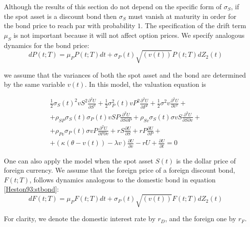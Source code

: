     \begin{frame}
        Although  the  results  of  this  section  do  not  depend  on  the specific
        form  of $\sigma_S$,  if  the  spot  asset  is  a  discount  bond  then  
        $\sigma_S$  must vanish  at  maturity  in  order  for  the  bond  price  
        to  reach  par  with  probability  $1$.  The  specification  of  the  drift
        term  $\mu_S$ is  not important  because it  will  not  affect  option  prices. 
        We  specify  analogous  dynamics  for the  bond  price:
        \begin{equation}\label{Heston93:stbond}
            dP(t; T) = \mu_P P(t; T) dt + \sigma_P(t) \sqrt{(v(t))} P(t; T)dZ_2(t)
        \end{equation}
    \end{frame}
    
    \begin{frame}
        we assume that the variances of both the spot asset and the bond are determined 
        by the same variable $v(t)$. In this model, the valuation equation is

        \begin{multline}
            \frac{1}{2}\sigma_S(t)^2vS^2\frac{\partial^2U}{\partial S^2} + \frac{1}{2}\sigma_P^2(t)vP^2\frac{\partial^2U}{\partial P^2} + \frac{1}{2}\sigma^2v\frac{\partial^2U}{\partial v^2} +\\+ \rho_{SP}\sigma_S(t)\sigma_P(t)vSP\frac{\partial^2 U}{\partial S \partial P} +
            \rho_{Sv}\sigma_S(t)\sigma vS\frac{\partial^2 U}{\partial S\partial v} +\\+ \rho_{Pv}\sigma_P(t)\sigma vP\frac{\partial^2 U}{\partial P \partial v} + rS\frac{\partial U}{\partial S} + rP\frac{\partial U}{\partial P} + \\ +
            \left(\kappa(\theta - v(t))-\lambda v\right)\frac{\partial U}{\partial v} - rU +\frac{\partial U}{\partial t} = 0
        \end{multline}
    \end{frame}

    \begin{frame}
        One  can  also  apply  the  model  when  the  spot  asset  $S(t)$  is  
        the  dollar price  of  foreign  currency.  We  assume  that  the  foreign 
        price  of  a  foreign discount  bond,  $F(t;  T)$,  follows  
        dynamics  analogous  to  the  domestic bond  in  equation \eqref{Heston93:stbond}:
        \begin{equation}\label{Heston93:stfx}
            dF(t; T) = \mu_P F(t; T) dt + \sigma_P(t) \sqrt{(v(t))} F(t; T)dZ_2(t)
        \end{equation}

        For clarity, we denote the domestic interest rate by $r_D$, and the foreign one by $r_F$.
    \end{frame}

